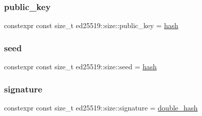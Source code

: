 \mbox{\label{namespaceed25519_1_1size_a8f8f1706b7e101ddc858ad26bdc010eb}} 
\subsubsection{\texorpdfstring{public\_key}{public\_key}}
{\footnotesize\ttfamily constexpr const size\+\_\+t ed25519\+::size\+::public\+\_\+key = \mbox{\hyperlink{namespaceed25519_1_1size_a0c20525cc9711076ec093177a8e36c25}{hash}}}

\mbox{\label{namespaceed25519_1_1size_a25303466af2d7379e9ceb5955dd70b57}} 
\subsubsection{\texorpdfstring{seed}{seed}}
{\footnotesize\ttfamily constexpr const size\+\_\+t ed25519\+::size\+::seed = \mbox{\hyperlink{namespaceed25519_1_1size_a0c20525cc9711076ec093177a8e36c25}{hash}}}

\mbox{\label{namespaceed25519_1_1size_adefacb85c80ee8d51c482044e6d79a26}} 
\subsubsection{\texorpdfstring{signature}{signature}}
{\footnotesize\ttfamily constexpr const size\+\_\+t ed25519\+::size\+::signature = \mbox{\hyperlink{namespaceed25519_1_1size_ac853f864bb12792f88647a998c3c030f}{double\+\_\+hash}}}

